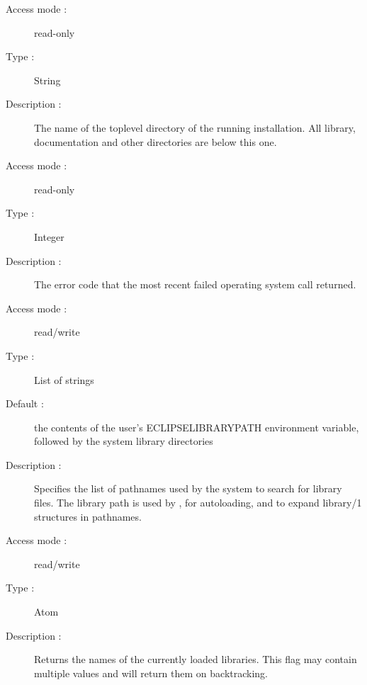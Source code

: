 \begin{description}
\begin{description}
\item[Access mode :] read-only
\item[Type :] String
\item[Description :] The name of the toplevel directory of the
running {\eclipse} installation. All {\eclipse} library, documentation and
other directories are below this one.
\end{description}


\begin{description}
\item[Access mode :] read-only
\item[Type :] Integer
\item[Description :] The error code that the most recent failed
operating system call returned.
\end{description}

\begin{description}
\item[Access mode :] read/write
\item[Type :] List of strings
\item[Default : ] the contents of the user's ECLIPSELIBRARYPATH environment
variable, followed by the system library directories
\item[Description :] Specifies the list of pathnames used by the system to
search for library files.
The library path is used by , for autoloading, and to expand
library/1 structures in pathnames.
\end{description}

\begin{description}
\item[Access mode : ] read/write
\item[Type : ] Atom
\item[Description : ] Returns the names of the currently loaded libraries.
This flag may contain multiple values and will return them on backtracking.
\end{description}


\end{description}

